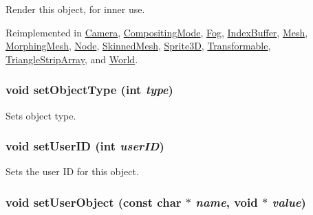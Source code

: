 Render this object, for inner use. 

Reimplemented in \hyperlink{classm3g_1_1Camera_1efcb1973989d9963d5bd6d03065d389}{Camera}, \hyperlink{classm3g_1_1CompositingMode_1efcb1973989d9963d5bd6d03065d389}{CompositingMode}, \hyperlink{classm3g_1_1Fog_1efcb1973989d9963d5bd6d03065d389}{Fog}, \hyperlink{classm3g_1_1IndexBuffer_1efcb1973989d9963d5bd6d03065d389}{IndexBuffer}, \hyperlink{classm3g_1_1Mesh_1efcb1973989d9963d5bd6d03065d389}{Mesh}, \hyperlink{classm3g_1_1MorphingMesh_1efcb1973989d9963d5bd6d03065d389}{MorphingMesh}, \hyperlink{classm3g_1_1Node_1efcb1973989d9963d5bd6d03065d389}{Node}, \hyperlink{classm3g_1_1SkinnedMesh_1efcb1973989d9963d5bd6d03065d389}{SkinnedMesh}, \hyperlink{classm3g_1_1Sprite3D_1efcb1973989d9963d5bd6d03065d389}{Sprite3D}, \hyperlink{classm3g_1_1Transformable_1efcb1973989d9963d5bd6d03065d389}{Transformable}, \hyperlink{classm3g_1_1TriangleStripArray_1efcb1973989d9963d5bd6d03065d389}{TriangleStripArray}, and \hyperlink{classm3g_1_1World_1efcb1973989d9963d5bd6d03065d389}{World}.\hypertarget{classm3g_1_1Object3D_777701a101d1332abffa2ad6a255b91d}{
\subsubsection[{setObjectType}]{\setlength{\rightskip}{0pt plus 5cm}void setObjectType (int {\em type})}}
\label{classm3g_1_1Object3D_777701a101d1332abffa2ad6a255b91d}


Sets object type. \hypertarget{classm3g_1_1Object3D_5e4753e91dca5aa56abacb7fde69f332}{
\subsubsection[{setUserID}]{\setlength{\rightskip}{0pt plus 5cm}void setUserID (int {\em userID})}}
\label{classm3g_1_1Object3D_5e4753e91dca5aa56abacb7fde69f332}


Sets the user ID for this object. \hypertarget{classm3g_1_1Object3D_989411d827091f4a5e97e0377bbd1a7a}{
\subsubsection[{setUserObject}]{\setlength{\rightskip}{0pt plus 5cm}void setUserObject (const char $\ast$ {\em name}, \/  void $\ast$ {\em value})}}
\label{classm3g_1_1Object3D_989411d827091f4a5e97e0377bbd1a7a}



